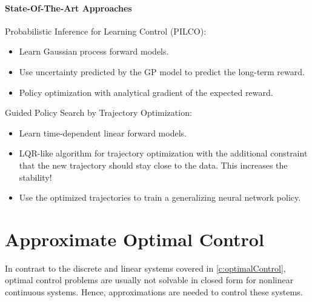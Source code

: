 			\subsubsection{State-Of-The-Art Approaches}
				Probabilistic Inference for Learning Control (PILCO):
				\begin{itemize}
					\item Learn Gaussian process forward models.
					\item Use uncertainty predicted by the GP model to predict the long-term reward.
					\item Policy optimization with analytical gradient of the expected reward.
				\end{itemize}
				Guided Policy Search by Trajectory Optimization:
				\begin{itemize}
					\item Learn time-dependent linear forward models.
					\item LQR-like algorithm for trajectory optimization with the additional constraint that the new trajectory should stay close to the data. This increases the stability!
					\item Use the optimized trajectories to train a generalizing neural network policy.
				\end{itemize}

\chapter{Approximate Optimal Control}
	\label{c:approximateOptimalControl}

	In contrast to the discrete and linear systems covered in \autoref{c:optimalControl}, optimal control problems are usually not solvable in closed form for nonlinear continuous systems. Hence, approximations are needed to control these systems.

